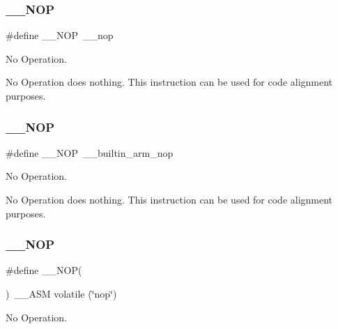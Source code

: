 \subsubsection{\texorpdfstring{\_\_NOP}{\_\_NOP}\hspace{0.1cm}{\footnotesize\ttfamily [1/3]}}
{\footnotesize\ttfamily \#define \+\_\+\+\_\+\+N\+OP~\+\_\+\+\_\+nop}



No Operation. 

No Operation does nothing. This instruction can be used for code alignment purposes. \mbox{\label{group___c_m_s_i_s___core___instruction_interface_gabd585ddc865fb9b7f2493af1eee1a572}} 
\subsubsection{\texorpdfstring{\_\_NOP}{\_\_NOP}\hspace{0.1cm}{\footnotesize\ttfamily [2/3]}}
{\footnotesize\ttfamily \#define \+\_\+\+\_\+\+N\+OP~\+\_\+\+\_\+builtin\+\_\+arm\+\_\+nop}



No Operation. 

No Operation does nothing. This instruction can be used for code alignment purposes. \mbox{\label{group___c_m_s_i_s___core___instruction_interface_ga0b13f3617dd4af2cd2eb3a311073f717}} 
\subsubsection{\texorpdfstring{\_\_NOP}{\_\_NOP}\hspace{0.1cm}{\footnotesize\ttfamily [3/3]}}
{\footnotesize\ttfamily \#define \+\_\+\+\_\+\+N\+OP(\begin{DoxyParamCaption}{ }\end{DoxyParamCaption})~\+\_\+\+\_\+\+A\+SM volatile (\char`\"{}nop\char`\"{})}



No Operation. 

